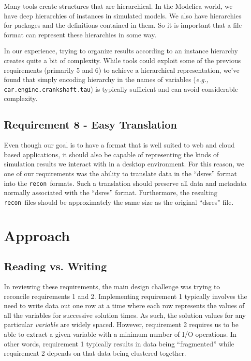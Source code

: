 \documentclass[11pt,a4paper,twocolumn]{article}
\newcommand{\recon}{\texttt{recon}}
\newcommand{\code}[1]{\texttt{#1}} %
\begin{document}

Many tools create structures that are hierarchical.  In the Modelica
world, we have deep hierarchies of instances in simulated models.  We
also have hierarchies for packages and the definitions contained in
them.  So it is important that a file format can represent these
hierarchies in some way.

In our experience, trying to organize results according to an instance
hierarchy creates quite a bit of complexity.  While tools could
exploit some of the previous requirements (primarily 5 and 6) to
achieve a hierarchical representation, we've found that simply
encoding hierarchy in the names of variables (\textit{e.g.,}
\code{car.engine.crankshaft.tau}) is typically sufficient and can
avoid considerable complexity.

\subsection{Requirement 8 - Easy Translation}


Even though our goal is to have a format that is well suited to web
and cloud based applications, it should also be capable of
representing the kinds of simulation results we interact with in a
desktop environment.  For this reason, we one of our requirements was
the ability to translate data in the ``dsres'' format into the
\recon\ formats.  Such a translation should preserve all data and
metadata normally associated with the ``dsres'' format.  Furthermore,
the resulting \recon\ files should be approximately the same size as
the original ``dsres'' file.

\section{Approach}

\subsection{Reading vs. Writing}

In reviewing these requirements, the main design challenge was trying
to reconcile requirements 1 and 2.  Implementing requirement 1
typically involves the need to write data out one row at a time where
each row represents the values of all the variables for successive
solution times.  As such, the solution values for any particular
\textit{variable} are widely spaced.  However, requirement 2 requires
us to be able to extract a given variable with a minimum number of I/O
operations.  In other words, requirement 1 typically results in data
being ``fragmented'' while requirement 2 depends on that data being
clustered together.
\end{document}
